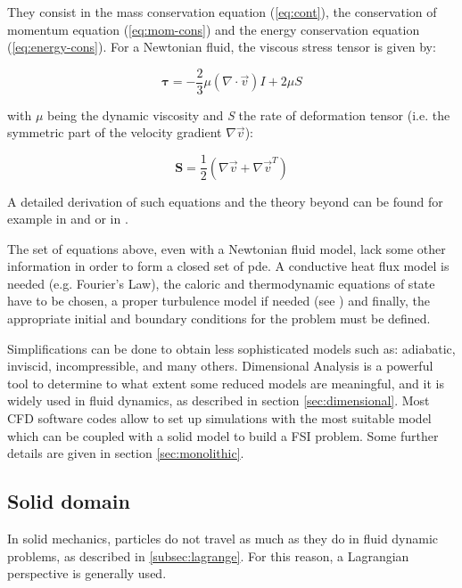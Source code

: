 They consist in the mass conservation equation (\ref{eq:cont}), the conservation of momentum equation (\ref{eq:mom-cons}) and the energy conservation equation (\ref{eq:energy-cons}). For a Newtonian fluid, the viscous stress tensor is given by:

\begin{equation}
	\label{eq:tau}
	\bm{\tau} = -\frac{2}{3}\mu \left( \nabla \cdot \vec{v} \right) I +2\mu S
\end{equation}

with $\mu$ being the dynamic viscosity and \textit{S} the rate of deformation tensor (i.e. the symmetric part of the velocity gradient $\nabla \vec{v}$):

\begin{equation}
	\label{eq:def_tens}
	\mathbf{S} = \frac{1}{2} \left( \nabla \vec{v} + \nabla \vec{v}^T \right)
\end{equation}

A detailed derivation of such equations and the theory beyond can be found for example in  \cite{quartapelle2013fluidodinamicaI} and \cite{quartapelle2013fluidodinamicaC} or in \cite{pope2001turbulent}. 

The set of equations above, even with a Newtonian fluid model, lack some other information in order to form a closed set of \acrfull{pde}. A conductive heat flux model is needed  (e.g. Fourier’s Law), the caloric and thermodynamic equations of state have to be chosen, a proper turbulence model if needed (see \cite{pope2001turbulent}) and finally, the appropriate initial and boundary conditions for the problem \cite{galdi2011introduction} must be defined.

Simplifications can be done to obtain less sophisticated models such as: adiabatic, inviscid, incompressible, and many others. Dimensional Analysis is a powerful tool to determine to what extent some reduced models are meaningful, and it is widely used in fluid dynamics, as described in section \ref{sec:dimensional}. Most CFD software codes allow to set up simulations with the most suitable model which can be coupled with a solid model to build a FSI problem. Some further details are given in section \ref{sec:monolithic}. 


\subsection{Solid domain}
\label{sec:solid}

In solid mechanics, particles do not travel as much as they do in fluid dynamic problems, as described in \ref{subsec:lagrange}. For this reason, a Lagrangian perspective is generally used.  

